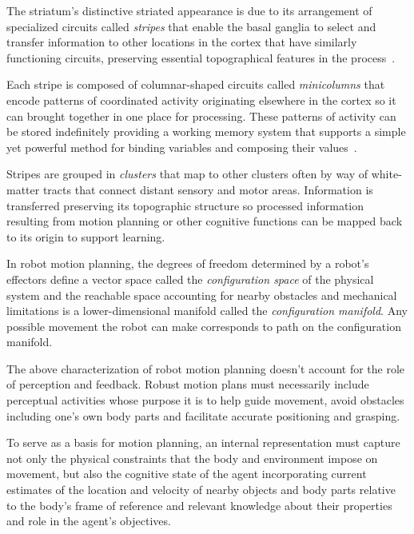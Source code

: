 The striatum's distinctive striated appearance is due to its arrangement of specialized circuits called {\it{stripes}} that enable the basal ganglia to select and transfer information to other locations in the cortex that have similarly functioning circuits, preserving essential topographical features in the process~\cite{BarbasandGarcia-CabezasCOiN-16,LewisetalJNC-02}.

Each stripe is composed of columnar-shaped circuits called {\it{minicolumns}} that encode patterns of coordinated activity originating elsewhere in the cortex so it can brought together in one place for processing. These patterns of activity can be stored indefinitely providing a working memory system that supports a simple yet powerful method for binding variables and composing their values~\cite{OReillyetalCCN-12}.

Stripes are grouped in {\it{clusters}} that map to other clusters often by way of white-matter tracts that connect distant sensory and motor areas. Information is transferred preserving its topographic structure so processed information resulting from motion planning or other cognitive functions can be mapped back to its origin to support learning.


In robot motion planning, the degrees of freedom determined by a robot's effectors define a vector space called the {\it{configuration space}} of the physical system and the reachable space accounting for nearby obstacles and mechanical limitations is a lower-dimensional manifold called the {\it{configuration manifold}}. Any possible movement the robot can make corresponds to path on the configuration manifold.

The above characterization of robot motion planning doesn't account for the role of perception and feedback. Robust motion plans must necessarily include perceptual activities whose purpose it is to help guide movement, avoid obstacles including one's own body parts and facilitate accurate positioning and grasping.      

To serve as a basis for motion planning, an internal representation must capture not only the physical constraints that the body and environment impose on movement, but also the cognitive state of the agent incorporating current estimates of the location and velocity of nearby objects and body parts relative to the body's frame of reference and relevant knowledge about their properties and role in the agent's objectives.

